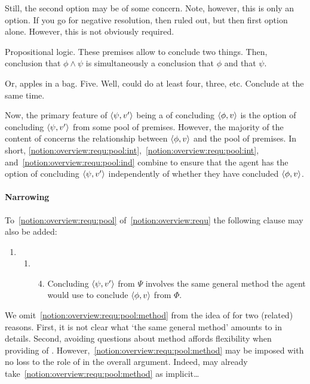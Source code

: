 \begin{note}
  Still, the second option may be of some concern.
  Note, however, this is only an option.
  If you go for negative resolution, then ruled out, but then first option alone.
  However, this is not obviously required.

  Propositional logic.
  These premises allow to conclude two things.
  Then, conclusion that \(\phi \land \psi\) is simultaneously a conclusion that \(\phi\) and that \(\psi\).

  Or, apples in a bag.
  Five.
  Well, could do at least four, three, etc.
  Conclude at the same time.
\end{note}

\begin{note}[\requ{1}]
  Now, the primary feature of \(\langle \psi, v' \rangle\) being a \requ{} of concluding \(\langle \phi, v \rangle\) is the option of concluding \(\langle \psi, v' \rangle\) from some pool of premises.
  However, the majority of the content of \label{idea:Zs:overview:requ} concerns the relationship between \(\langle \phi, v \rangle\) and the pool of premises.
  In short, \autoref{notion:overview:requ:pool:int},~\autoref{notion:overview:requ:pool:int}, and~\autoref{notion:overview:requ:pool:ind} combine to ensure that the agent has the option of concluding \(\langle \psi, v' \rangle\) independently of whether they have concluded \(\langle \phi, v \rangle\).
\end{note}

\paragraph*{Narrowing }

\begin{note}
  To~\autoref{notion:overview:requ:pool} of~\autoref{notion:overview:requ} the following clause may also be added:
  \begin{enumerate}[label=]
  \item
    \begin{enumerate}[label=]
    \item
      \begin{enumerate}[label=\roman*., ref=(\roman*), resume*=csIdeaCounter]
        \setcounter{enumiii}{3}
      \item
        \label{notion:overview:requ:pool:method}
        Concluding \(\langle \psi, v' \rangle\) from \(\Psi\) involves the same general method the agent would use to conclude \(\langle \phi, v \rangle\) from \(\Phi\).
      \end{enumerate}
    \end{enumerate}
  \end{enumerate}
  We omit~\autoref{notion:overview:requ:pool:method} from the idea of \csN{} for two (related) reasons.
  First, it is not clear what `the same general method' amounts to in details.
  Second, avoiding questions about method affords flexibility when providing  of \csN{}.
  However,~\autoref{notion:overview:requ:pool:method} may be imposed with no loss to the role of \csN{} in the overall argument.
  Indeed, may already take~\autoref{notion:overview:requ:pool:method} as implicit\dots
\end{note}

